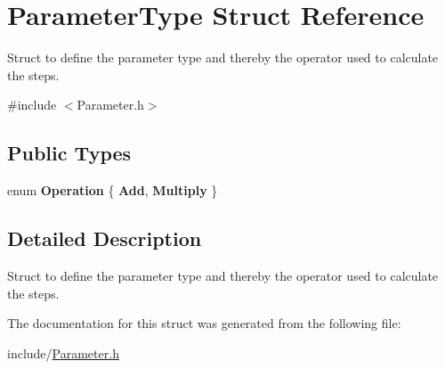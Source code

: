 \hypertarget{structParameterType}{\section{Parameter\-Type Struct Reference}
\label{structParameterType}
}


Struct to define the parameter type and thereby the operator used to calculate the steps.  




{\ttfamily \#include $<$Parameter.\-h$>$}

\subsection*{Public Types}
\begin{DoxyCompactItemize}
\item 
enum {\bfseries Operation} \{ {\bfseries Add}, 
{\bfseries Multiply}
 \}
\end{DoxyCompactItemize}


\subsection{Detailed Description}
Struct to define the parameter type and thereby the operator used to calculate the steps. 

The documentation for this struct was generated from the following file\-:\begin{DoxyCompactItemize}
\item 
include/\hyperlink{Parameter_8h}{Parameter.\-h}\end{DoxyCompactItemize}
